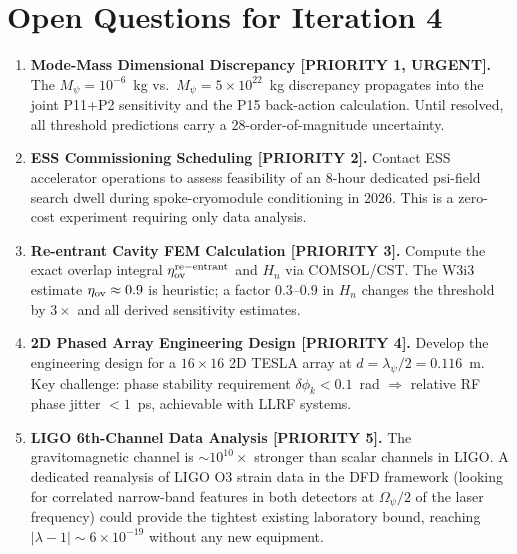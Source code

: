 \documentclass[11pt,twocolumn]{article}
\newcommand{\lam}{\lambda}
\newcommand{\Opsi}{\Omega_\psi}
\newcommand{\Mpsi}{M_\psi}
\newcommand{\ee}[1]{\times 10^{#1}}
\begin{document}
\section{Open Questions for Iteration 4}
\label{sec:open_questions}

\begin{enumerate}[label=\textbf{OQ\arabic*.}]

\item \textbf{Mode-Mass Dimensional Discrepancy [PRIORITY 1, URGENT].}
  The $\Mpsi = 10^{-6}$~kg vs.\ $\Mpsi = 5\ee{22}$~kg discrepancy
  propagates into the joint P11+P2 sensitivity and the P15 back-action
  calculation. Until resolved, all threshold predictions carry a
  $28$-order-of-magnitude uncertainty.

\item \textbf{ESS Commissioning Scheduling [PRIORITY 2].}
  Contact ESS accelerator operations to assess feasibility of an 8-hour
  dedicated psi-field search dwell during spoke-cryomodule conditioning
  in 2026. This is a zero-cost experiment requiring only data analysis.

\item \textbf{Re-entrant Cavity FEM Calculation [PRIORITY 3].}
  Compute the exact overlap integral $\eta_{\rm ov}^{\rm re-entrant}$
  and $H_n$ via COMSOL/CST. The W3i3 estimate $\eta_{\rm ov} \approx 0.9$
  is heuristic; a factor $0.3$--$0.9$ in $H_n$ changes the
  threshold by $3\times$ and all derived sensitivity estimates.

\item \textbf{2D Phased Array Engineering Design [PRIORITY 4].}
  Develop the engineering design for a $16\times16$ 2D TESLA array
  at $d = \lambda_\psi/2 = 0.116$~m. Key challenge: phase stability
  requirement $\delta\phi_k < 0.1$~rad $\Rightarrow$ relative RF phase
  jitter $< 1$~ps, achievable with LLRF systems.

\item \textbf{LIGO 6th-Channel Data Analysis [PRIORITY 5].}
  The gravitomagnetic channel is $\sim 10^{10}\times$ stronger than
  scalar channels in LIGO. A dedicated reanalysis of LIGO O3 strain
  data in the DFD framework (looking for correlated narrow-band features
  in both detectors at $\Opsi/2$ of the laser frequency) could provide
  the tightest existing laboratory bound, reaching $|\lam-1|\sim 6\ee{-19}$
  without any new equipment.

\end{enumerate}
\end{document}
